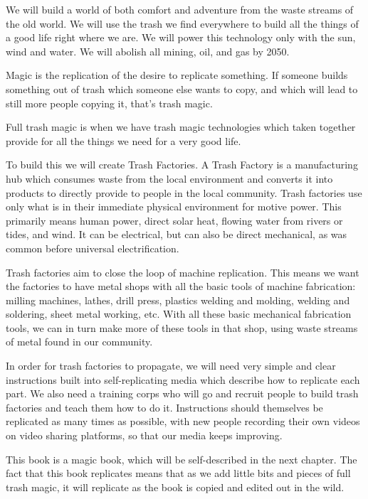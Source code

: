 


We will build a world of both comfort and adventure from the waste streams of the old world.  We will use the trash we find everywhere to build all the things of a good life right where we are.  We will power this technology only with the sun, wind and water.  We will abolish all mining, oil, and gas by 2050.

Magic is the replication of the desire to replicate something.  If someone builds something out of trash which someone else wants to copy, and which will lead to still more people copying it, that's trash magic.  

Full trash magic is when we have trash magic technologies which taken together provide for all the things we need for a very good life.

To build this we will create Trash Factories.  A Trash Factory is a manufacturing hub which consumes waste from the local environment and converts it into products to directly provide to people in the local community.  Trash factories use only what is in their immediate physical environment for motive power.  This primarily means human power, direct solar heat, flowing water from rivers or tides, and wind.  It can be electrical, but can also be direct mechanical, as was common before universal electrification.  

Trash factories aim to close the loop of machine replication. This means we want the factories to have metal shops with all the basic tools of machine fabrication: milling machines, lathes, drill press, plastics welding and molding, welding and soldering, sheet metal working, etc.  With all these basic mechanical fabrication tools, we can in turn make more of these tools in that shop, using waste streams of metal found in our community.  

In order for trash factories to propagate, we will need very simple and clear instructions built into self-replicating media which describe how to replicate each part.  We also need a training corps who will go and recruit people to build trash factories and teach them how to do it.  Instructions should themselves be replicated as many times as possible, with new people recording their own videos on video sharing platforms, so that our media keeps improving.  

This book is a magic book, which will be self-described in the next chapter.  The fact that this book replicates means that as we add little bits and pieces of full trash magic, it will replicate as the book is copied and edited out in the wild.  

